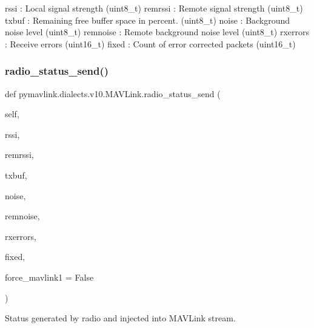 \begin{DoxyVerb}
\begin{DoxyVerb}
\begin{DoxyVerb}
\begin{DoxyVerb}
\begin{DoxyVerb}
rssi                      : Local signal strength (uint8_t)
remrssi                   : Remote signal strength (uint8_t)
txbuf                     : Remaining free buffer space in percent. (uint8_t)
noise                     : Background noise level (uint8_t)
remnoise                  : Remote background noise level (uint8_t)
rxerrors                  : Receive errors (uint16_t)
fixed                     : Count of error corrected packets (uint16_t)\end{DoxyVerb}
 \mbox{\label{classpymavlink_1_1dialects_1_1v10_1_1MAVLink_a5230f63ccc810973b56b840b26bee45b}} 
\subsubsection{\texorpdfstring{radio\+\_\+status\+\_\+send()}{radio\_status\_send()}}
{\footnotesize\ttfamily def pymavlink.\+dialects.\+v10.\+M\+A\+V\+Link.\+radio\+\_\+status\+\_\+send (\begin{DoxyParamCaption}\item[{}]{self,  }\item[{}]{rssi,  }\item[{}]{remrssi,  }\item[{}]{txbuf,  }\item[{}]{noise,  }\item[{}]{remnoise,  }\item[{}]{rxerrors,  }\item[{}]{fixed,  }\item[{}]{force\+\_\+mavlink1 = {\ttfamily False} }\end{DoxyParamCaption})}

\begin{DoxyVerb}Status generated by radio and injected into MAVLink stream.


\end{DoxyVerb}
\end{DoxyVerb}
\end{DoxyVerb}
\end{DoxyVerb}
\end{DoxyVerb}
